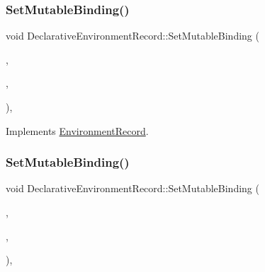 \mbox{\label{struct_declarative_environment_record_a9e0b7b5b57e3125b4288a30e2ceac63c}} 
\subsubsection{\texorpdfstring{Set\+Mutable\+Binding()}{SetMutableBinding()}\hspace{0.1cm}{\footnotesize\ttfamily [1/2]}}
{\footnotesize\ttfamily void Declarative\+Environment\+Record\+::\+Set\+Mutable\+Binding (\begin{DoxyParamCaption}\item[{const \textbf{ std\+::string} \&}]{,  }\item[{const \hyperlink{class_type}{Type} \&}]{,  }\item[{bool}]{ }\end{DoxyParamCaption})\hspace{0.3cm}{\ttfamily [final]}, {\ttfamily [virtual]}}



Implements \hyperlink{struct_environment_record_a9d5250a9cc6fa4d1f9ecbf5213b6cb24}{Environment\+Record}.

\mbox{\label{struct_declarative_environment_record_aa1136051a94789af3f2f4b75f0266a04}} 
\subsubsection{\texorpdfstring{Set\+Mutable\+Binding()}{SetMutableBinding()}\hspace{0.1cm}{\footnotesize\ttfamily [2/2]}}
{\footnotesize\ttfamily void Declarative\+Environment\+Record\+::\+Set\+Mutable\+Binding (\begin{DoxyParamCaption}\item[{\hyperlink{struct_environment_record_ab67bd5dbacae338473147ec3f753a364}{String\+Ref}}]{,  }\item[{const \hyperlink{class_type}{Type} \&}]{,  }\item[{const \hyperlink{struct_boolean}{Boolean} \&}]{ }\end{DoxyParamCaption})\hspace{0.3cm}{\ttfamily [final]}, {\ttfamily [virtual]}}



